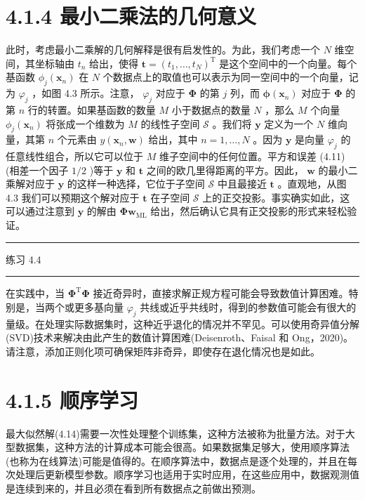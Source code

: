 \documentclass[10pt]{report}
\newcommand{\HRule}{\begin{center}\rule{0.9\linewidth}{0.2mm}\end{center}}
\begin{document}
\section*{4.1.4 最小二乘法的几何意义}

此时，考虑最小二乘解的几何解释是很有启发性的。为此，我们考虑一个 \(N\) 维空间，其坐标轴由 \({t}_{n}\) 给出，使得 \(\mathbf{t} = {\left( {t}_{1},\ldots ,{t}_{N}\right) }^{\mathrm{T}}\) 是这个空间中的一个向量。每个基函数 \({\phi }_{j}\left( {\mathbf{x}}_{n}\right)\) 在 \(N\) 个数据点上的取值也可以表示为同一空间中的一个向量，记为 \({\varphi }_{j}\) ，如图 4.3 所示。注意， \({\varphi }_{j}\) 对应于 \(\mathbf{\Phi }\) 的第 \(j\) 列，而 \(\mathbf{\phi }\left( {\mathbf{x}}_{n}\right)\) 对应于 \(\mathbf{\Phi }\) 的第 \(n\) 行的转置。如果基函数的数量 \(M\) 小于数据点的数量 \(N\) ，那么 \(M\) 个向量 \({\phi }_{j}\left( {\mathbf{x}}_{n}\right)\) 将张成一个维数为 \(M\) 的线性子空间 \(\mathcal{S}\) 。我们将 \(\mathbf{y}\) 定义为一个 \(N\) 维向量，其第 \(n\) 个元素由 \(y\left( {{\mathbf{x}}_{n},\mathbf{w}}\right)\) 给出，其中 \(n = 1,\ldots ,N\) 。因为 \(\mathbf{y}\) 是向量 \({\varphi }_{j}\) 的任意线性组合，所以它可以位于 \(M\) 维子空间中的任何位置。平方和误差 (4.11) (相差一个因子 \(1/2\) )等于 \(\mathbf{y}\) 和 \(\mathbf{t}\) 之间的欧几里得距离的平方。因此， \(\mathbf{w}\) 的最小二乘解对应于 \(\mathbf{y}\) 的这样一种选择，它位于子空间 \(\mathcal{S}\) 中且最接近 \(\mathbf{t}\) 。直观地，从图 4.3 我们可以预期这个解对应于 \(\mathbf{t}\) 在子空间 \(\mathcal{S}\) 上的正交投影。事实确实如此，这可以通过注意到 \(\mathbf{y}\) 的解由 \({\mathbf{{\Phi w}}}_{\mathrm{{ML}}}\) 给出，然后确认它具有正交投影的形式来轻松验证。

\HRule

练习 4.4

\HRule

在实践中，当 \({\mathbf{\Phi }}^{\mathrm{T}}\mathbf{\Phi }\) 接近奇异时，直接求解正规方程可能会导致数值计算困难。特别是，当两个或更多基向量 \({\varphi }_{j}\) 共线或近乎共线时，得到的参数值可能会有很大的量级。在处理实际数据集时，这种近乎退化的情况并不罕见。可以使用奇异值分解(SVD)技术来解决由此产生的数值计算困难(Deisenroth、Faisal 和 Ong，2020)。请注意，添加正则化项可确保矩阵非奇异，即使存在退化情况也是如此。

\section*{4.1.5 顺序学习}

最大似然解(4.14)需要一次性处理整个训练集，这种方法被称为批量方法。对于大型数据集，这种方法的计算成本可能会很高。如果数据集足够大，使用顺序算法(也称为在线算法)可能是值得的。在顺序算法中，数据点是逐个处理的，并且在每次处理后更新模型参数。顺序学习也适用于实时应用，在这些应用中，数据观测值是连续到来的，并且必须在看到所有数据点之前做出预测。
\end{document}
